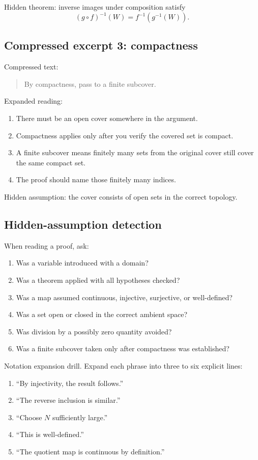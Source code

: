 Hidden theorem: inverse images under composition satisfy
\[
(g\circ f)^{-1}(W)=f^{-1}(g^{-1}(W)).
\]

\subsection{Compressed excerpt 3: compactness}

Compressed text:

\begin{quote}
By compactness, pass to a finite subcover.
\end{quote}

Expanded reading:

\begin{enumerate}
\item There must be an open cover somewhere in the argument.
\item Compactness applies only after you verify the covered set is compact.
\item A finite subcover means finitely many sets from the original cover still cover the same compact set.
\item The proof should name those finitely many indices.
\end{enumerate}

Hidden assumption: the cover consists of open sets in the correct topology.

\subsection{Hidden-assumption detection}

When reading a proof, ask:

\begin{enumerate}
\item Was a variable introduced with a domain?
\item Was a theorem applied with all hypotheses checked?
\item Was a map assumed continuous, injective, surjective, or well-defined?
\item Was a set open or closed in the correct ambient space?
\item Was division by a possibly zero quantity avoided?
\item Was a finite subcover taken only after compactness was established?
\end{enumerate}

\begin{labbox}
Notation expansion drill. Expand each phrase into three to six explicit lines:
\begin{enumerate}
\item ``By injectivity, the result follows.''
\item ``The reverse inclusion is similar.''
\item ``Choose $N$ sufficiently large.''
\item ``This is well-defined.''
\item ``The quotient map is continuous by definition.''
\end{enumerate}
\end{labbox}

